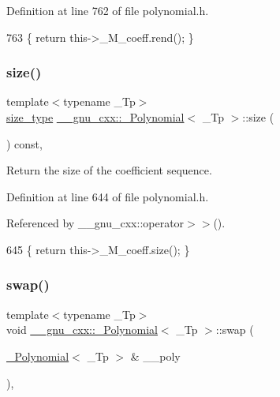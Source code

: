 Definition at line 762 of file polynomial.\+h.


\begin{DoxyCode}
763       \{ \textcolor{keywordflow}{return} this->\_M\_coeff.rend(); \}
\end{DoxyCode}
\mbox{\label{class____gnu__cxx_1_1__Polynomial_aa0ae73f79d58962dc4f1e4df2d2cc0d2}} 
\subsubsection{\texorpdfstring{size()}{size()}}
{\footnotesize\ttfamily template$<$typename \+\_\+\+Tp$>$ \\
\hyperlink{class____gnu__cxx_1_1__Polynomial_a8b25fcfd4acaad0c5c08b649c22da28a}{size\+\_\+type} \hyperlink{class____gnu__cxx_1_1__Polynomial}{\+\_\+\+\_\+gnu\+\_\+cxx\+::\+\_\+\+Polynomial}$<$ \+\_\+\+Tp $>$\+::size (\begin{DoxyParamCaption}{ }\end{DoxyParamCaption}) const\hspace{0.3cm}{\ttfamily [inline]}, {\ttfamily [noexcept]}}

Return the size of the coefficient sequence. 

Definition at line 644 of file polynomial.\+h.



Referenced by \+\_\+\+\_\+gnu\+\_\+cxx\+::operator$>$$>$().


\begin{DoxyCode}
645       \{ \textcolor{keywordflow}{return} this->\_M\_coeff.size(); \}
\end{DoxyCode}
\mbox{\label{class____gnu__cxx_1_1__Polynomial_aec8b248101f7340d46fbac13b07b45bc}} 
\subsubsection{\texorpdfstring{swap()}{swap()}}
{\footnotesize\ttfamily template$<$typename \+\_\+\+Tp$>$ \\
void \hyperlink{class____gnu__cxx_1_1__Polynomial}{\+\_\+\+\_\+gnu\+\_\+cxx\+::\+\_\+\+Polynomial}$<$ \+\_\+\+Tp $>$\+::swap (\begin{DoxyParamCaption}\item[{\hyperlink{class____gnu__cxx_1_1__Polynomial}{\+\_\+\+Polynomial}$<$ \+\_\+\+Tp $>$ \&}]{\+\_\+\+\_\+poly }\end{DoxyParamCaption})\hspace{0.3cm}{\ttfamily [inline]}, {\ttfamily [noexcept]}}

